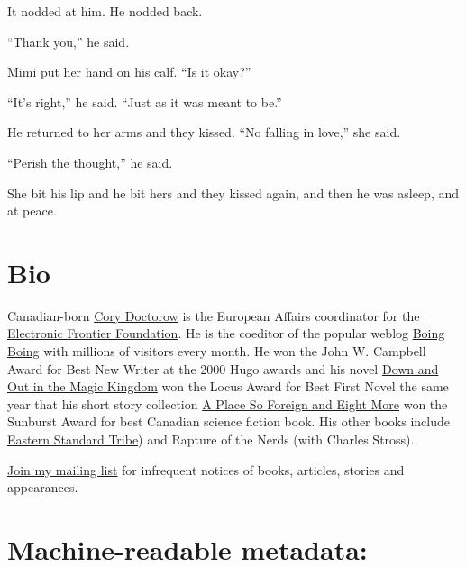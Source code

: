 \documentclass{article}
\begin{document}
It nodded at him.  He nodded back.

``Thank you,'' he said.

Mimi put her hand on his calf.  ``Is it okay?''

``It's right,'' he said.  ``Just as it was meant to be.''

He returned to her arms and they kissed.  ``No falling in love,'' she
said.

``Perish the thought,'' he said.

She bit his lip and he bit hers and they kissed again, and then he was
asleep, and at peace.

\section{Bio}

Canadian-born \href{http://www.craphound.com/}{Cory Doctorow} is
the European Affairs coordinator for the 
\break
\href{http://www.eff.org}{Electronic Frontier Foundation}.  He is
the coeditor of the popular weblog 
\href{http://boingboing.net}{Boing Boing} with millions of visitors
every month.  He won the John W.  Campbell Award for Best New Writer
at the 2000 Hugo awards and his novel 
\href{http://craphound.com/down/}{Down and Out in the Magic
Kingdom} won the Locus Award for Best First Novel the same year
that his short story collection 
\href{http://craphound.com/place/}{A Place So Foreign and Eight
More} won the Sunburst Award for best Canadian science fiction
book.  His other books include 
\href{http://craphound.com/est/}{Eastern Standard Tribe}) and
Rapture of the Nerds (with Charles Stross).

\href{http://www.ctyme.com/mailman/listinfo/doctorow}{Join my mailing
list} for infrequent notices of books, articles, stories and
appearances.

\section{Machine-readable metadata:}
\end{document}
